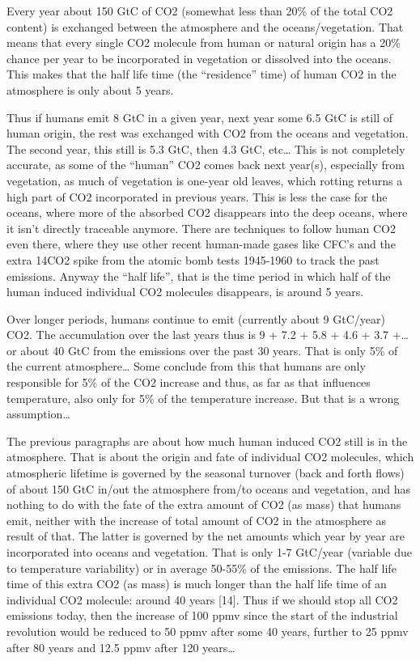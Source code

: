 \documentclass[
]{book}
\begin{document}
Every year about 150 GtC of CO2 (somewhat less than 20\% of the total CO2 content) is exchanged between the atmosphere and the oceans/vegetation. That means that every single CO2 molecule from human or natural origin has a 20\% chance per year to be incorporated in vegetation or dissolved into the oceans.
This makes that the half life time (the ``residence'' time) of human CO2 in the atmosphere is only about 5 years.

Thus if humans emit 8 GtC in a given year, next year some 6.5 GtC is still of human origin, the rest was exchanged with CO2 from the oceans and vegetation. The second year, this still is 5.3 GtC, then 4.3 GtC, etc\ldots{} This is not completely accurate, as some of the ``human'' CO2 comes back next year(s), especially from vegetation, as much of vegetation is one-year old leaves, which rotting returns a high part of CO2 incorporated in previous years. This is less the case for the oceans, where more of the absorbed CO2 disappears into the deep oceans, where it isn't directly traceable anymore. There are techniques to follow human CO2 even there, where they use other recent human-made gases like CFC's and the extra 14CO2 spike from the atomic bomb tests 1945-1960 to track the past emissions. Anyway the ``half life'', that is the time period in which half of the human induced individual CO2 molecules disappears, is around 5 years.

Over longer periods, humans continue to emit (currently about 9 GtC/year) CO2. The accumulation over the last years thus is 9 + 7.2 + 5.8 + 4.6 + 3.7 +\ldots{} or about 40 GtC from the emissions over the past 30 years. That is only 5\% of the current atmosphere\ldots{}
Some conclude from this that humans are only responsible for 5\% of the CO2 increase and thus, as far as that influences temperature, also only for 5\% of the temperature increase. But that is a wrong assumption\ldots{}

The previous paragraphs are about how much human induced CO2 still is in the atmosphere. That is about the origin and fate of individual CO2 molecules, which atmospheric lifetime is governed by the seasonal turnover (back and forth flows) of about 150 GtC in/out the atmosphere from/to oceans and vegetation, and has nothing to do with the fate of the extra amount of CO2 (as mass) that humans emit, neither with the increase of total amount of CO2 in the atmosphere as result of that. The latter is governed by the net amounts which year by year are incorporated into oceans and vegetation. That is only 1-7 GtC/year (variable due to temperature variability) or in average 50-55\% of the emissions. The half life time of this extra CO2 (as mass) is much longer than the half life time of an individual CO2 molecule: around 40 years {[}14{]}. Thus if we should stop all CO2 emissions today, then the increase of 100 ppmv since the start of the industrial revolution would be reduced to 50 ppmv after some 40 years, further to 25 ppmv after 80 years and 12.5 ppmv after 120 years\ldots{}
\end{document}
